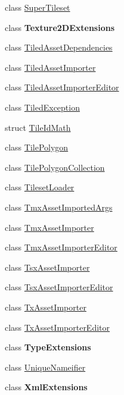 \begin{DoxyCompactItemize}
class \mbox{\hyperlink{class_super_tiled2_unity_1_1_editor_1_1_super_tileset}{Super\+Tileset}}
\item 
class {\bfseries Texture2\+D\+Extensions}
\item 
class \mbox{\hyperlink{class_super_tiled2_unity_1_1_editor_1_1_tiled_asset_dependencies}{Tiled\+Asset\+Dependencies}}
\item 
class \mbox{\hyperlink{class_super_tiled2_unity_1_1_editor_1_1_tiled_asset_importer}{Tiled\+Asset\+Importer}}
\item 
class \mbox{\hyperlink{class_super_tiled2_unity_1_1_editor_1_1_tiled_asset_importer_editor}{Tiled\+Asset\+Importer\+Editor}}
\item 
class \mbox{\hyperlink{class_super_tiled2_unity_1_1_editor_1_1_tiled_exception}{Tiled\+Exception}}
\item 
struct \mbox{\hyperlink{struct_super_tiled2_unity_1_1_editor_1_1_tile_id_math}{Tile\+Id\+Math}}
\item 
class \mbox{\hyperlink{class_super_tiled2_unity_1_1_editor_1_1_tile_polygon}{Tile\+Polygon}}
\item 
class \mbox{\hyperlink{class_super_tiled2_unity_1_1_editor_1_1_tile_polygon_collection}{Tile\+Polygon\+Collection}}
\item 
class \mbox{\hyperlink{class_super_tiled2_unity_1_1_editor_1_1_tileset_loader}{Tileset\+Loader}}
\item 
class \mbox{\hyperlink{class_super_tiled2_unity_1_1_editor_1_1_tmx_asset_imported_args}{Tmx\+Asset\+Imported\+Args}}
\item 
class \mbox{\hyperlink{class_super_tiled2_unity_1_1_editor_1_1_tmx_asset_importer}{Tmx\+Asset\+Importer}}
\item 
class \mbox{\hyperlink{class_super_tiled2_unity_1_1_editor_1_1_tmx_asset_importer_editor}{Tmx\+Asset\+Importer\+Editor}}
\item 
class \mbox{\hyperlink{class_super_tiled2_unity_1_1_editor_1_1_tsx_asset_importer}{Tsx\+Asset\+Importer}}
\item 
class \mbox{\hyperlink{class_super_tiled2_unity_1_1_editor_1_1_tsx_asset_importer_editor}{Tsx\+Asset\+Importer\+Editor}}
\item 
class \mbox{\hyperlink{class_super_tiled2_unity_1_1_editor_1_1_tx_asset_importer}{Tx\+Asset\+Importer}}
\item 
class \mbox{\hyperlink{class_super_tiled2_unity_1_1_editor_1_1_tx_asset_importer_editor}{Tx\+Asset\+Importer\+Editor}}
\item 
class {\bfseries Type\+Extensions}
\item 
class \mbox{\hyperlink{class_super_tiled2_unity_1_1_editor_1_1_unique_nameifier}{Unique\+Nameifier}}
\item 
class {\bfseries Xml\+Extensions}
\end{DoxyCompactItemize}
